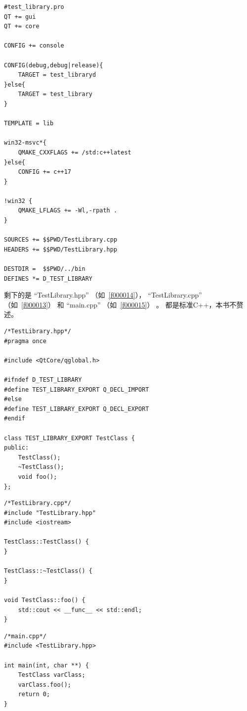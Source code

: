\begin{lstlisting}[label=f000012,
caption=GoodLuck,
title=\lstlistingname\ \thelstlisting
]
#test_library.pro
QT += gui
QT += core

CONFIG += console

CONFIG(debug,debug|release){
    TARGET = test_libraryd
}else{
    TARGET = test_library
}

TEMPLATE = lib

win32-msvc*{
    QMAKE_CXXFLAGS += /std:c++latest
}else{
    CONFIG += c++17
}

!win32 {
    QMAKE_LFLAGS += -Wl,-rpath .
}

SOURCES += $$PWD/TestLibrary.cpp
HEADERS += $$PWD/TestLibrary.hpp

DESTDIR =  $$PWD/../bin
DEFINES *= D_TEST_LIBRARY
\end{lstlisting}          %


剩下的是
“TestLibrary.hpp”
（如\lstlistingname\ \ref{f000014}），
“TestLibrary.cpp”
（如\lstlistingname\ \ref{f000013}）
和
“main.cpp”
（如\lstlistingname\ \ref{f000015}）
。
都是标准C++，本书不赘述。
\begin{lstlisting}[label=f000014,
caption=GoodLuck,
title=\lstlistingname\ \thelstlisting
]
/*TestLibrary.hpp*/
#pragma once

#include <QtCore/qglobal.h>

#ifndef D_TEST_LIBRARY
#define TEST_LIBRARY_EXPORT Q_DECL_IMPORT
#else
#define TEST_LIBRARY_EXPORT Q_DECL_EXPORT
#endif

class TEST_LIBRARY_EXPORT TestClass {
public:
    TestClass();
    ~TestClass();
    void foo();
};
\end{lstlisting}          %
\begin{lstlisting}[label=f000013,
caption=GoodLuck,
title=\lstlistingname\ \thelstlisting
]
/*TestLibrary.cpp*/
#include "TestLibrary.hpp"
#include <iostream>

TestClass::TestClass() {
}

TestClass::~TestClass() {
}

void TestClass::foo() {
    std::cout << __func__ << std::endl;
}
\end{lstlisting}          %
\begin{lstlisting}[label=f000015,
caption=GoodLuck,
title=\lstlistingname\ \thelstlisting
]
/*main.cpp*/
#include <TestLibrary.hpp>

int main(int, char **) {
    TestClass varClass;
    varClass.foo();
    return 0;
}
\end{lstlisting}          %


